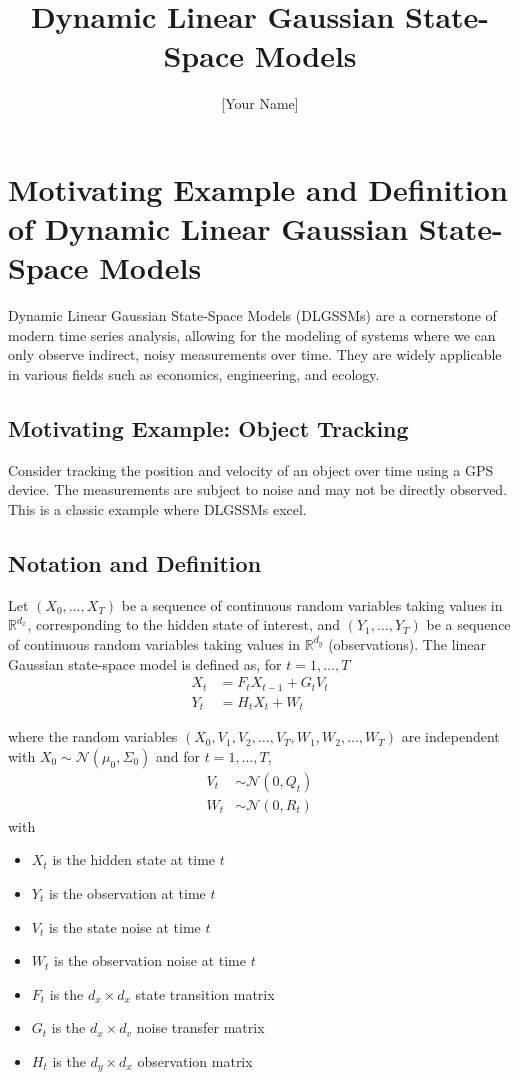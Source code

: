 \documentclass{article}
\title{Dynamic Linear Gaussian State-Space Models}
\author{[Your Name]}
\date{}
\begin{document}
\maketitle

\section{Motivating Example and Definition of Dynamic Linear Gaussian State-Space Models}
Dynamic Linear Gaussian State-Space Models (DLGSSMs) are a cornerstone of modern time series analysis, allowing for the modeling of systems where we can only observe indirect, noisy measurements over time. They are widely applicable in various fields such as economics, engineering, and ecology.

\subsection{Motivating Example: Object Tracking}
Consider tracking the position and velocity of an object over time using a GPS device. The measurements are subject to noise and may not be directly observed. This is a classic example where DLGSSMs excel.

\subsection{Notation and Definition}
Let $\left(X_0, \ldots, X_T\right)$ be a sequence of continuous random variables taking values in $\mathbb{R}^{d_x}$, corresponding to the hidden state of interest, and $\left(Y_1, \ldots, Y_T\right)$ be a sequence of continuous random variables taking values in $\mathbb{R}^{d_y}$ (observations). The linear Gaussian state-space model is defined as, for $t=1, \ldots, T$
$$
\begin{aligned}
X_t & =F_t X_{t-1}+G_t V_t \\
Y_t & =H_t X_t+W_t
\end{aligned}
$$

where the random variables $\left(X_0, V_1, V_2, \ldots, V_T, W_1, W_2, \ldots, W_T\right)$ are independent with $X_0 \sim \mathcal{N}\left(\mu_0, \Sigma_0\right)$ and for $t=1, \ldots, T$,
$$
\begin{aligned}
V_t & \sim \mathcal{N}\left(0, Q_t\right) \\
W_t & \sim \mathcal{N}\left(0, R_t\right)
\end{aligned}
$$
with
\begin{itemize}
    \item $X_t$ is the hidden state at time $t$
    \item $Y_t$ is the observation at time $t$
    \item $V_t$ is the state noise at time $t$
    \item $W_t$ is the observation noise at time $t$
    \item $F_t$ is the $d_x \times d_x$ state transition matrix
    \item $G_t$ is the $d_x \times d_v$ noise transfer matrix
    \item $H_t$ is the $d_y \times d_x$ observation matrix
\end{itemize}
\end{document}
